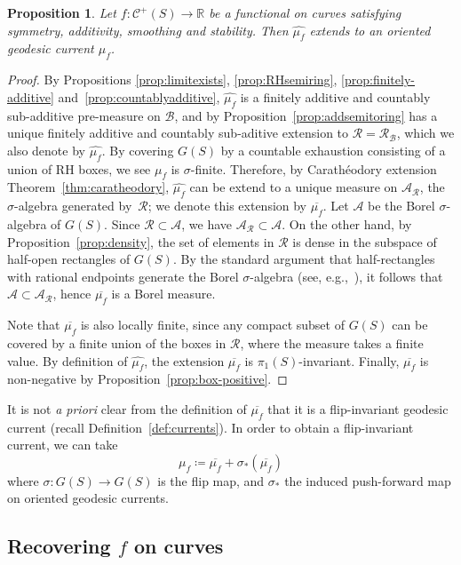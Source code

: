 \documentclass[11pt]{amsart}
\numberwithin{equation}{section}
\numberwithin{figure}{section}
\newtheorem{proposition}[theorem]{Proposition}
\theoremstyle{definition}
\theoremstyle{plain}
\newcommand\cA{\ensuremath{\mathcal{A}}}
\newcommand\cR{\ensuremath{\mathcal{R}}}
\newcommand*{\wh}[1]{\widehat{#1}}
\newcommand{\Curves}{\mathcal{C}}
\begin{document}
\begin{proposition}
Let $f \colon \Curves^+(S) \to \mathbb{R}$ be a functional on curves satisfying symmetry, additivity, smoothing and stability.
Then $\wh{\mu_f}$ extends to an oriented geodesic current $\mu_f$.
\end{proposition}
\begin{proof}
By Propositions \ref{prop:limitexists}, \ref{prop:RHsemiring},
\ref{prop:finitely-additive} and~\ref{prop:countablyadditive}, $\wh{\mu_f}$
is a finitely
additive and countably sub-additive pre-measure on $\mathcal{B}$, and by Proposition~\ref{prop:addsemitoring} has a unique finitely additive and countably sub-aditive extension to $\mathcal{R}=\mathcal{R}_{\mathcal{B}}$, which we also denote by $\wh{\mu_f}$. By covering $G(S)$ by a countable exhaustion consisting of a union of RH boxes, we see $\mu_f$ is $\sigma$-finite.
Therefore, by Carathéodory extension Theorem~\ref{thm:caratheodory},
$\wh{\mu_f}$ can be extend to a unique measure on
$\mathcal{A}_{\mathcal{R}}$, the $\sigma$-algebra generated
by~$\mathcal{R}$; we denote this extension by $\overline{\mu_f}$.
Let $\cA$ be the Borel $\sigma$-algebra of $G(S)$.
Since $\cR \subset \cA$, we have $\cA_{\cR} \subset \cA$.
On the other hand, by Proposition~\ref{prop:density}, the set of elements in
$\mathcal{R}$ is dense in the subspace of half-open rectangles of
$G(S)$. By the standard argument that half-rectangles with rational endpoints generate the Borel $\sigma$-algebra (see, e.g.,~\cite[Lemma~1.2.11]{Bo07:MeasureTheory}), it follows that $\cA \subset \cA_{\cR}$, hence $\overline{\mu_f}$ is a Borel measure.

Note that $\overline{\mu_f}$ is also locally finite, since any compact subset
of $G(S)$ can be covered by a finite union of the boxes in
$\mathcal{R}$, where the measure takes a finite value.
By definition of $\wh{\mu_f}$, the extension $\overline{\mu_f}$ is
$\pi_1(S)$-invariant. Finally, $\overline{\mu_f}$ is non-negative by
Proposition~\ref{prop:box-positive}.
\end{proof}

It is not \emph{a priori} clear from the definition of $\overline{\mu_f}$ that it is a flip-invariant geodesic current (recall
Definition~\ref{def:currents}).
In order to obtain a flip-invariant current, we can take
\[
\mu_f \coloneqq \overline{\mu_f} + \sigma_*(\overline{\mu_f})
\]
where $\sigma \colon G(S) \to G(S)$ is the flip map, and $\sigma_*$
the induced push-forward map on oriented geodesic currents.

\subsection{
Recovering \texorpdfstring{$f$}{f} on curves}
\label{sec:recovery}
\end{document}
